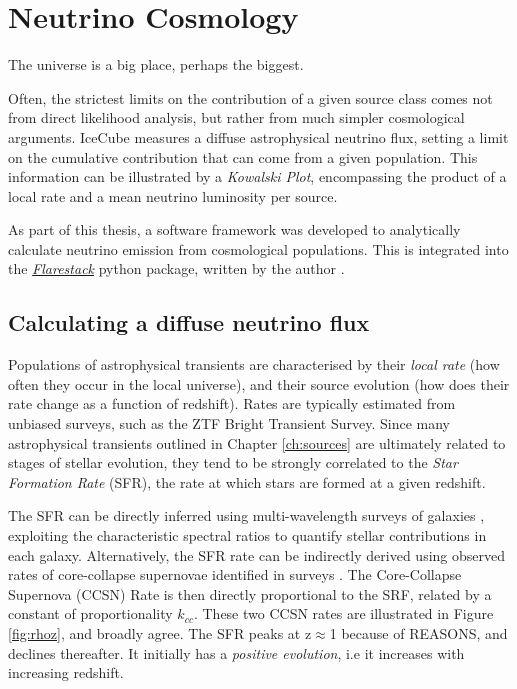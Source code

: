 \setchapterpreamble[u]{\margintoc}
\chapter{Neutrino Cosmology}
\begin{fquote}The universe is a big place, perhaps the biggest.
\end{fquote}

Often, the strictest limits on the contribution of a given source class comes not from direct likelihood analysis, but rather from much simpler cosmological arguments. IceCube measures a diffuse astrophysical neutrino flux, setting a limit on the cumulative contribution that can come from a given population. This information can be illustrated by a \emph{Kowalski Plot}, encompassing the product of a local rate and a mean neutrino luminosity per source. 

As part of this thesis, a software framework was developed to analytically calculate neutrino emission from cosmological populations. This is integrated into the \emph{\href{https://github.com/IceCubeOpenSource/flarestack}{Flarestack}} python package, written by the author .

\section{Calculating a diffuse neutrino flux}

Populations of astrophysical transients are characterised by their \emph{local rate} (how often they occur in the local universe), and their source evolution (how does their rate change as a function of redshift). Rates are typically estimated from unbiased surveys, such as the ZTF Bright Transient Survey. Since many astrophysical transients outlined in Chapter \ref{ch:sources} are ultimately related to stages of stellar evolution, they tend to be strongly correlated to the \emph{Star Formation Rate} (SFR), the rate at which stars are formed at a given redshift.

The SFR can be directly inferred using multi-wavelength surveys of galaxies , exploiting the characteristic spectral ratios to quantify stellar contributions in each galaxy. Alternatively, the SFR rate can be indirectly derived using observed rates of core-collapse supernovae identified in surveys . The Core-Collapse Supernova (CCSN) Rate is then directly proportional to the SRF, related by a constant of proportionality $k_{cc}$. These two CCSN rates are illustrated in Figure \ref{fig:rhoz}, and broadly agree. The SFR peaks at z$\approx$1 because of REASONS, and declines thereafter. It initially has a \emph{positive evolution}, i.e it increases with increasing redshift. 

